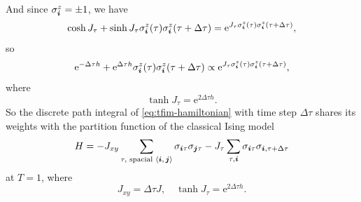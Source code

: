 \documentclass[hyperref, a4paper]{article}
\newcommand*{\ee}{\mathrm{e}}
\newcommand*{\pair}[1]{\langle #1 \rangle}
\newcommand*{\cim}{classical Ising model }
\begin{document}
And since $\sigma_{\vb*{i}}^z = \pm 1$, we have
\[
    \cosh J_\tau + \sinh J_\tau \sigma^z_{\vb*{i}}(\tau) \sigma^z_{\vb*{i}}(\tau + \Delta \tau) = \ee^{J_\tau \sigma^z_{\vb*{i}}(\tau) \sigma^z_{\vb*{i}}(\tau + \Delta \tau)},
\]
so 
\[
    \ee^{- \Delta \tau h} + \ee^{\Delta \tau h} \sigma^z_{\vb*{i}}(\tau) \sigma^z_{\vb*{i}}(\tau + \Delta \tau) \propto \ee^{J_\tau \sigma^z_{\vb*{i}}(\tau) \sigma^z_{\vb*{i}}(\tau + \Delta \tau)},
\]
where
\[
    \tanh J_\tau = \ee^{2 \Delta \tau h}.
\]
So the discrete path integral of \eqref{eq:tfim-hamiltonian} with time step $\Delta \tau$ shares its weights with the partition function of the \cim
\begin{equation}
    H = - J_{xy} \sum_{\tau, \text{ spacial $\pair{\vb*{i}, \vb*{j}}$}} \sigma_{\vb*{i} \tau} \sigma_{\vb*{j} \tau} - J_\tau \sum_{\tau, \vb*{i}} \sigma_{\vb*{i} \tau} \sigma_{\vb*{i}, \tau + \Delta \tau}
    \label{eq:cim-from-tfim} 
\end{equation}
at $T = 1$, where
\begin{equation}
    J_{xy} = \Delta \tau J, \quad \tanh J_\tau = \ee^{2 \Delta \tau h}.
\end{equation}
\end{document}
